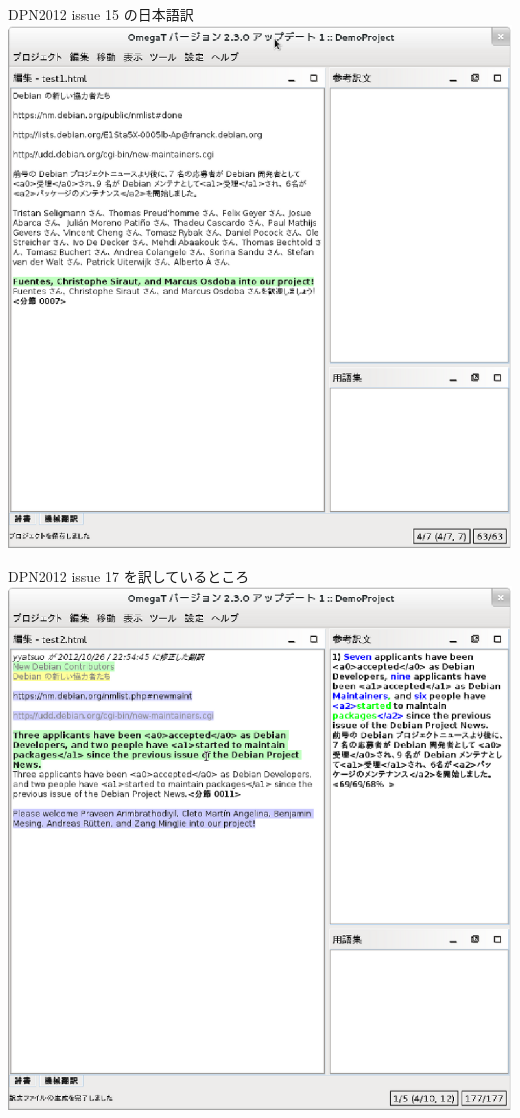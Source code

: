 \documentclass[mingoth,a4paper]{jsarticle}
\begin{document}
\begin{itembox}[l]{DPN2012 issue 15 の日本語訳}
    \includegraphics{image201210/omegat_demo1.eps}
\end{itembox}

\begin{itembox}[l]{DPN2012 issue 17 を訳しているところ}
    \includegraphics{image201210/omegat_demo2.eps}
\end{itembox}
\end{document}
